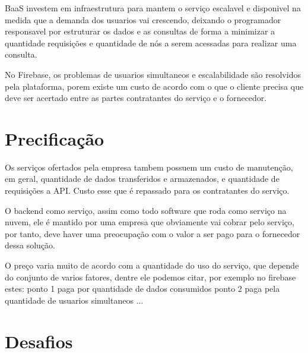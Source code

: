 	BaaS investem em infraestrutura para mantem o serviço escalavel e disponivel na medida que a demanda dos usuarios vai crescendo, deixando o programador responsavel por estruturar os dados e as consultas de forma a minimizar a quantidade requisições e quantidade de nós a serem acessadas para realizar uma consulta. 

	No Firebase, os problemas de usuarios simultaneos e escalabilidade são resolvidos pela plataforma, porem existe um custo de acordo com o que o cliente precisa que deve ser acertado entre as partes contratantes do serviço e o fornecedor. 


\section{Precificação}%
\label{sec:pricing}
	Os serviços ofertados pela empresa tambem possuem um custo de manutenção, em geral, quantidade de dados transferidos e armazenados, e quantidade de requisições a API. Custo esse que é repassado para os contratantes do serviço.

	O backend como serviço, assim como todo software que roda como serviço na nuvem, ele é mantido por uma empresa que obviamente vai cobrar pelo serviço, por tanto, deve haver uma preocupação com o valor a ser pago para o fornecedor dessa solução.
	
	O preço varia muito de acordo com a quantidade do uso do serviço, que depende do conjunto de varios fatores, dentre ele podemos citar, por exemplo no firebase estes:
		ponto 1 paga por quantidade de dados consumidos
		ponto 2 paga pela quantidade de usuarios simultaneos
		...


\section{Desafios}
\label{sec:challenges}
	

